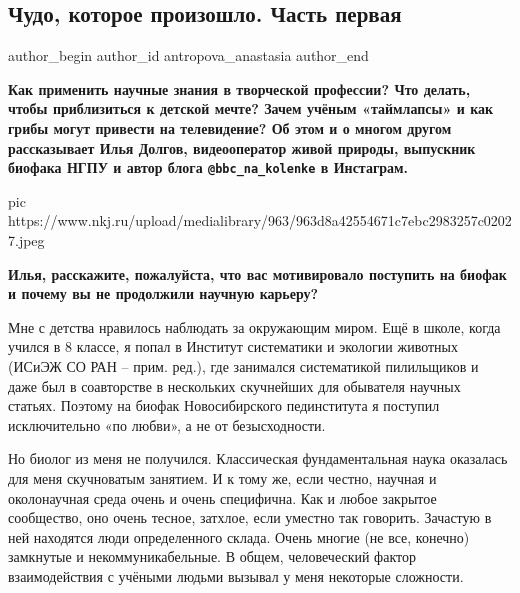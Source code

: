  
 
 
 
 
 
\subsection{Чудо, которое произошло. Часть первая}
\label{sec:25_10_2020.sites.ru.nauka_i_zhizn.antropova_anastasia.1.chudo_kotoroje_proizoshlo_1}
\ifcmt
  author_begin
   author_id antropova_anastasia
  author_end
\fi

\begin{leftbar}
        \bfseries Как применить научные знания в творческой профессии? Что
        делать, чтобы приблизиться к детской мечте? Зачем учёным «таймлапсы» и
        как грибы могут привести на телевидение? Об этом и о многом другом
        рассказывает Илья Долгов, видеооператор живой природы, выпускник
        биофака НГПУ и автор блога \verb|@bbc_na_kolenke| в Инстаграм.
\end{leftbar}

\ifcmt
pic https://www.nkj.ru/upload/medialibrary/963/963d8a42554671c7ebc2983257c02027.jpeg
\fi

\textbf{Илья, расскажите, пожалуйста, что вас мотивировало поступить на биофак и почему
вы не продолжили научную карьеру?}

Мне с детства нравилось наблюдать за окружающим миром. Ещё в школе, когда
учился в 8 классе, я попал в Институт систематики и экологии животных (ИСиЭЖ СО
РАН – прим. ред.), где занимался систематикой пилильщиков и даже был в
соавторстве в нескольких скучнейших для обывателя научных статьях. Поэтому на
биофак Новосибирского пединститута я поступил исключительно «по любви», а не от
безысходности.

Но биолог из меня не получился. Классическая фундаментальная наука оказалась
для меня скучноватым занятием. И к тому же, если честно, научная и околонаучная
среда очень и очень специфична. Как и любое закрытое сообщество, оно очень
тесное, затхлое, если уместно так говорить. Зачастую в ней находятся люди
определенного склада. Очень многие (не все, конечно) замкнутые и
некоммуникабельные. В общем, человеческий фактор взаимодействия с учёными
людьми вызывал у меня некоторые сложности.

